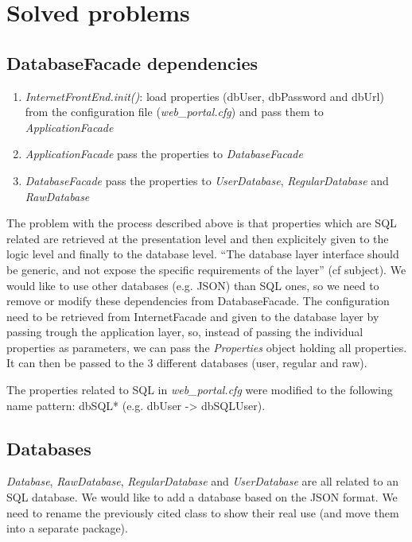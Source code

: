 \section{Solved problems}
\subsection{DatabaseFacade dependencies}

\begin{enumerate}
\item \emph{InternetFrontEnd.init()}: load properties (dbUser, dbPassword and
    dbUrl) from the configuration file (\emph{web\_portal.cfg}) and pass them to
    \emph{ApplicationFacade}
    
\item \emph{ApplicationFacade} pass the properties to \emph{DatabaseFacade}

\item \emph{DatabaseFacade} pass the properties to \emph{UserDatabase},
    \emph{RegularDatabase} and \emph{RawDatabase}
\end{enumerate}

The problem with the process described above is that properties which are SQL
related are retrieved at the presentation level and then explicitely given to
the logic level and finally to the database level. ``The database layer
interface should be generic, and not expose the specific requirements of the
layer'' (cf subject).
We would like to use other databases (e.g. JSON) than SQL ones, so we need to
remove or modify these dependencies from DatabaseFacade. The configuration need
to be retrieved from InternetFacade and given to the database layer by passing
trough the application layer, so, instead of passing the individual properties
as parameters, we can pass the \emph{Properties} object holding all properties.
It can then be passed to the 3 different databases (user, regular and raw).

The properties related to SQL in \emph{web\_portal.cfg} were modified to the
following name pattern: dbSQL* (e.g. dbUser -> dbSQLUser).

\subsection{Databases}

\emph{Database}, \emph{RawDatabase}, \emph{RegularDatabase} and
\emph{UserDatabase} are all related to an SQL database. We would like to
add a database based on the JSON format. We need to rename the
previously cited class to show their real use (and move them into a
separate package).

